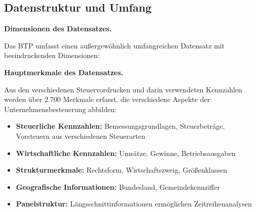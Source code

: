 \documentclass[
  german,
  10pt,
  twoside]{article}
\providecommand{\tightlist}{%
  \setlength{\itemsep}{0pt}\setlength{\parskip}{0pt}}
\begin{document}
\subsection{Datenstruktur und Umfang}\label{datenstruktur-und-umfang}

\textbf{Dimensionen des Datensatzes.}

Das BTP umfasst einen außergewöhnlich umfangreichen Datensatz mit
beeindruckenden Dimensionen:

\begin{table}

\caption{\label{tbl-btp-stats}Übersicht über die Dimensionen des Business-Tax-Panel}


\end{table}%

\textbf{Hauptmerkmale des Datensatzes.}

Aus den verschiedenen Steuervordrucken und darin verwendeten Kennzahlen
werden über 2.700 Merkmale erfasst, die verschiedene Aspekte der
Unternehmensbesteuerung abbilden:

\begin{itemize}
\tightlist
\item
  \textbf{Steuerliche Kennzahlen:} Bemessungsgrundlagen, Steuerbeträge,
  Vorsteuern aus verschiedenen Steuerarten
\item
  \textbf{Wirtschaftliche Kennzahlen:} Umsätze, Gewinne,
  Betriebsausgaben
\item
  \textbf{Strukturmerkmale:} Rechtsform, Wirtschaftszweig, Größenklassen
\item
  \textbf{Geografische Informationen:} Bundesland, Gemeindekennziffer
\item
  \textbf{Panelstruktur:} Längsschnittinformationen ermöglichen
  Zeitreihenanalysen
\end{itemize}
\end{document}
